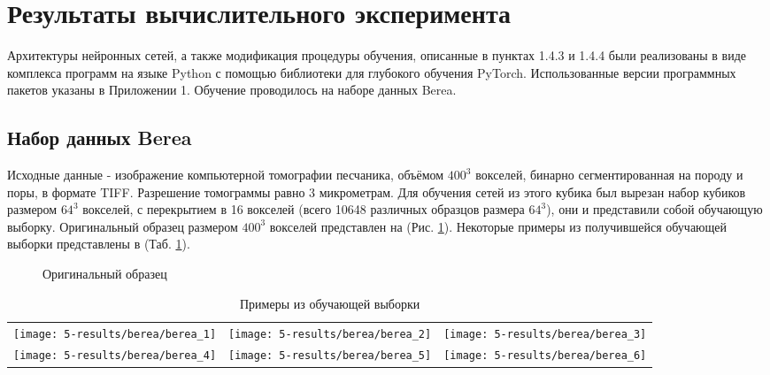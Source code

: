 \clearpage
\section{Результаты вычислительного эксперимента}
	Архитектуры нейронных сетей, а также модификация процедуры обучения, описанные в пунктах 1.4.3 и 1.4.4 были реализованы в виде комплекса программ на языке Python с помощью библиотеки для глубокого обучения PyTorch. Использованные версии программных пакетов указаны в Приложении 1. Обучение проводилось на наборе данных Berea.
	
	\subsection{Набор данных Berea}
		Исходные данные - изображение компьютерной томографии песчаника, объёмом $400^3$ вокселей, бинарно сегментированная на породу и поры, в формате TIFF. Разрешение томограммы равно 3 микрометрам. Для обучения сетей из этого кубика был вырезан набор кубиков размером $64^3$ вокселей, с перекрытием в 16 вокселей (всего 10648 различных образцов размера $64^3$), они и представили собой обучающую выборку. Оригинальный образец размером $400^3$ вокселей представлен на (Рис. \ref{5-full-berea}). Некоторые примеры из получившейся обучающей выборки представлены в (Таб. \ref{5-berea64}).
		
		\begin{figure}[h]
			\caption{Оригинальный образец}
			\label{5-full-berea}
		\end{figure}
	
		\begin{table}[h]
			\centering
			\begin{tabular}{p{5cm} p{5cm} p{5cm}}
				\toprule
				\texttt{[image: 5-results/berea/berea\_1]}
				&
				\texttt{[image: 5-results/berea/berea\_2]}
				&
				\texttt{[image: 5-results/berea/berea\_3]}
				\\
				\texttt{[image: 5-results/berea/berea\_4]}
				&
				\texttt{[image: 5-results/berea/berea\_5]}
				&
				\texttt{[image: 5-results/berea/berea\_6]}
				\\
				\bottomrule
			\end{tabular}
			\caption{Примеры из обучающей выборки}
			\label{5-berea64}
		\end{table}
